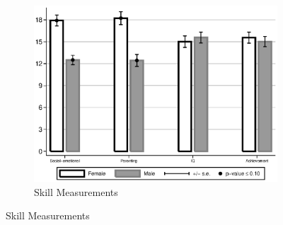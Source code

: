 \begin{figure}[!htbp]
\centering
\caption{Differences Between ABC/CARE Males and Females}
\label{fig:intro-gdiff-plots}
\begin{subfigure}[h]{0.55\textwidth}
	\centering
	\caption{Skill Measurements}
	\label{fig:intro-skills-plots-skills}
	\includegraphics[width=\textwidth]{../output/abccare-gdiff-skills}
\end{subfigure}


\end{figure}

